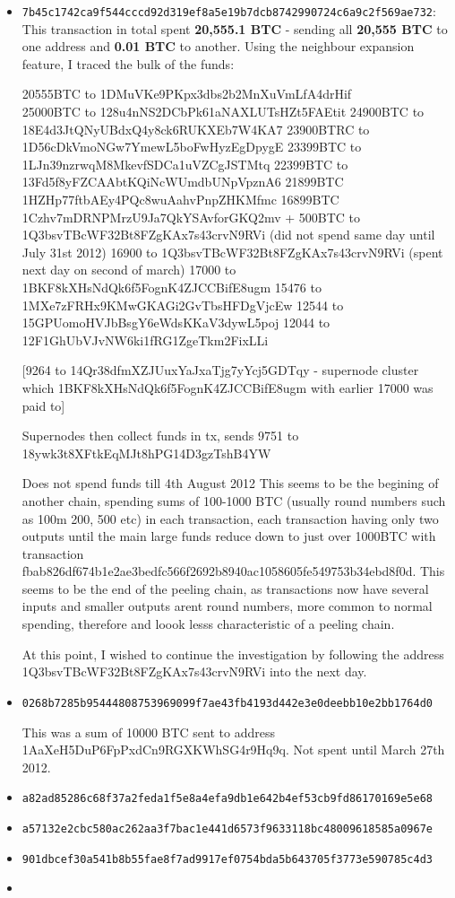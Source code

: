 \begin{itemize}
\item \texttt{7b45c1742ca9f544cccd92d319ef8a5e19b7dcb8742990724c6a9c2f569ae732}: This transaction in total spent \textbf{20,555.1 BTC} - sending all \textbf{20,555 BTC} to one address and \textbf{0.01 BTC} to another. Using the neighbour expansion feature, I traced the bulk of the funds: 

20555BTC to 1DMuVKe9PKpx3dbs2b2MnXuVmLfA4drHif\\
25000BTC to 128u4nNS2DCbPk61aNAXLUTsHZt5FAEtit
24900BTC to 18E4d3JtQNyUBdxQ4y8ck6RUKXEb7W4KA7
23900BTRC to 1D56cDkVmoNGw7YmewL5boFwHyzEgDpygE
23399BTC to 1LJn39nzrwqM8MkevfSDCa1uVZCgJSTMtq
22399BTC to 13Fd5f8yFZCAAbtKQiNcWUmdbUNpVpznA6
21899BTC 1HZHp77ftbAEy4PQc8wuAahvPnpZHKMfmc
16899BTC 1Czhv7mDRNPMrzU9Ja7QkYSAvforGKQ2mv + 500BTC to 1Q3bsvTBcWF32Bt8FZgKAx7s43crvN9RVi (did not spend same day until July 31st 2012)
16900 to 1Q3bsvTBcWF32Bt8FZgKAx7s43crvN9RVi (spent next day on second of march)
17000 to 1BKF8kXHsNdQk6f5FognK4ZJCCBifE8ugm
15476 to 1MXe7zFRHx9KMwGKAGi2GvTbsHFDgVjcEw
12544 to 15GPUomoHVJbBsgY6eWdsKKaV3dywL5poj
12044 to 12F1GhUbVJvNW6ki1fRG1ZgeTkm2FixLLi


[9264 to 14Qr38dfmXZJUuxYaJxaTjg7yYcj5GDTqy - supernode cluster which 1BKF8kXHsNdQk6f5FognK4ZJCCBifE8ugm with earlier 17000 was paid to]

Supernodes then collect funds in tx, sends 9751 to 18ywk3t8XFtkEqMJt8hPG14D3gzTshB4YW

Does not spend funds till 4th August 2012
This seems to be the begining of another chain, spending sums of 100-1000 BTC (usually round numbers such as 100m 200, 500 etc) in each transaction, each transaction having only two outputs until the main large funds reduce down to just over 1000BTC with transaction fbab826df674b1e2ae3bedfc566f2692b8940ac1058605fe549753b34ebd8f0d. This seems to be the end of the peeling chain, as transactions now have several inputs and smaller outputs arent round numbers, more common to normal spending, therefore and loook lesss characteristic of a peeling chain. 


At this point, I wished to continue the investigation by following the address 1Q3bsvTBcWF32Bt8FZgKAx7s43crvN9RVi into the next day. 

\item \texttt{0268b7285b95444808753969099f7ae43fb4193d442e3e0deebb10e2bb1764d0}


This was a sum of 10000 BTC sent to address 1AaXeH5DuP6FpPxdCn9RGXKWhSG4r9Hq9q. Not spent until March 27th 2012.


\item \texttt{a82ad85286c68f37a2feda1f5e8a4efa9db1e642b4ef53cb9fd86170169e5e68}
\item \texttt{a57132e2cbc580ac262aa3f7bac1e441d6573f9633118bc48009618585a0967e}
\item \texttt{901dbcef30a541b8b55fae8f7ad9917ef0754bda5b643705f3773e590785c4d3}
\item 

\end{itemize}

